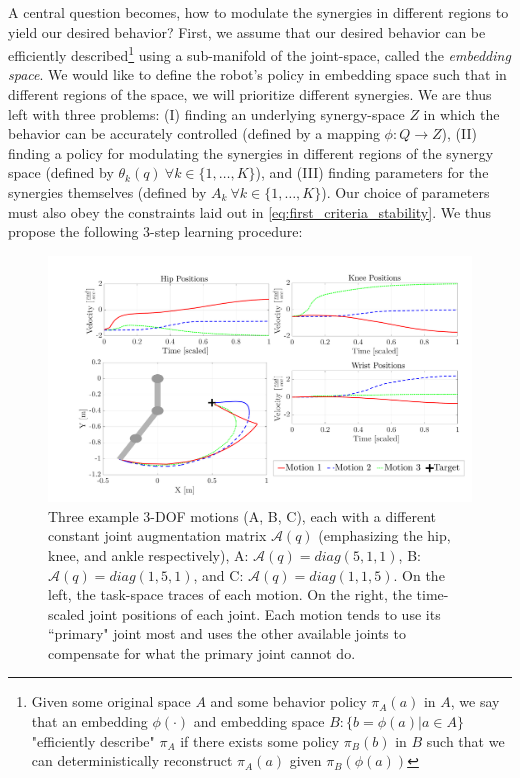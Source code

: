 \documentclass[letterpaper, 10 pt, conference,fleqn]{ieeeconf}
\begin{document}
A central question becomes, how to modulate the synergies in different regions to yield our desired behavior? First, we assume that our desired behavior can be efficiently described\footnote{Given some original space $A$ and some behavior policy $\pi_A(a)$ in $A$, we say that an embedding $\phi(\cdot)$ and embedding space $B: \{b = \phi(a) | a \in A\}$ "efficiently describe" $\pi_A$ if there exists some policy $\pi_B(b)$ in $B$ such that we can deterministically reconstruct $\pi_A(a)$ given $\pi_B(\phi(a))$} using a sub-manifold of the joint-space, called the \emph{embedding space}. We would like to define the robot's policy in embedding space such that in different regions of the space, we will prioritize different synergies. We are thus left with three problems: (I) finding an underlying synergy-space $Z$ in which the behavior can be accurately controlled (defined by a mapping $\phi: Q \rightarrow Z$), (II) finding a policy for modulating the synergies in different regions of the synergy space (defined by $\theta_k(q)~\forall k\in\{1,\dots,K\}$), and (III) finding parameters for the synergies themselves (defined by $A_k~\forall k\in\{1,\dots,K\}$). Our choice of parameters must also obey the constraints laid out in \eqref{eq:first_criteria_stability}. We thus propose the following 3-step learning procedure:

\begin{figure}[t]
	\centering
	\includegraphics[width=\linewidth]{../Pic/A_comparison_positions.pdf}
	\caption{Three example 3-DOF motions (A, B, C), each with a different constant joint augmentation matrix $\mathcal{A}(q)$ (emphasizing the hip, knee, and ankle respectively), A: $\mathcal{A}(q)=diag(5,1,1) $, B: $\mathcal{A}(q)=diag(1,5,1)$, and C: $\mathcal{A}(q)=diag(1,1,5)$. On the left, the task-space traces of each motion. On the right, the time-scaled joint positions of each joint. Each motion tends to use its ``primary" joint most and uses the other available joints to compensate for what the primary joint cannot do.}
	\label{fig:A_example}
	\vspace{-15pt}
\end{figure}
\end{document}
